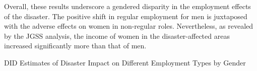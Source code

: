 \documentclass[a4paper,12pt]{article}
\begin{document}
Overall, these results underscore a gendered disparity in the employment effects of the disaster. The positive shift in regular employment for men is juxtaposed with the adverse effects on women in non-regular roles. Nevertheless, as revealed by the JGSS analysis, the income of women in the disaster-affected areas increased significantly more than that of men.

\begin{landscape}
\thispagestyle{fancy}
\fancyhf{}  %
\renewcommand{\headrulewidth}{0pt}  %
\begin{table}[htbp]
\centering
\caption{DID Estimates of Disaster Impact on Different Employment Types by Gender}



\end{table}
\end{landscape}
\end{document}
